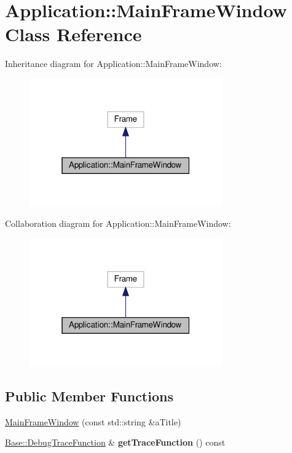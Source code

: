 \hypertarget{class_application_1_1_main_frame_window}{}\section{Application\+:\+:Main\+Frame\+Window Class Reference}
\label{class_application_1_1_main_frame_window}


Inheritance diagram for Application\+:\+:Main\+Frame\+Window\+:
\nopagebreak
\begin{figure}[H]
\begin{center}
\leavevmode
\includegraphics[width=235pt]{class_application_1_1_main_frame_window__inherit__graph}
\end{center}
\end{figure}


Collaboration diagram for Application\+:\+:Main\+Frame\+Window\+:
\nopagebreak
\begin{figure}[H]
\begin{center}
\leavevmode
\includegraphics[width=235pt]{class_application_1_1_main_frame_window__coll__graph}
\end{center}
\end{figure}
\subsection*{Public Member Functions}
\begin{DoxyCompactItemize}
\item 
\hyperlink{class_application_1_1_main_frame_window_a6cd8f5a881e4589dc8afa01d5f7ed4ba}{Main\+Frame\+Window} (const std\+::string \&a\+Title)
\item 
\hyperlink{class_base_1_1_debug_trace_function}{Base\+::\+Debug\+Trace\+Function} \& {\bfseries get\+Trace\+Function} () const \hypertarget{class_application_1_1_main_frame_window_a2ab17ead4b86890ec440398eda10273b}{}\label{class_application_1_1_main_frame_window_a2ab17ead4b86890ec440398eda10273b}

\end{DoxyCompactItemize}

